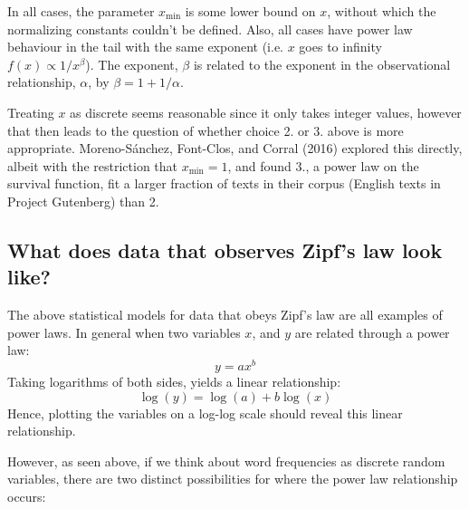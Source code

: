 \documentclass[]{article}
\begin{document}
In all cases, the parameter \(x_\text{min}\) is some lower bound on
\(x\), without which the normalizing constants couldn't be defined.
Also, all cases have power law behaviour in the tail with the same
exponent (i.e. \(x\) goes to infinity \(f(x) \propto 1/x^\beta\)). The
exponent, \(\beta\) is related to the exponent in the observational
relationship, \(\alpha\), by \(\beta = 1 + 1/\alpha\).

Treating \(x\) as discrete seems reasonable since it only takes integer
values, however that then leads to the question of whether choice 2. or
3. above is more appropriate. Moreno-Sánchez, Font-Clos, and Corral
(2016) explored this directly, albeit with the restriction that
\(x_\text{min} = 1\), and found 3., a power law on the survival
function, fit a larger fraction of texts in their corpus (English texts
in Project Gutenberg) than 2.

\hypertarget{what-does-data-that-observes-zipfs-law-look-like}{%
\subsection{What does data that observes Zipf's law look
like?}\label{what-does-data-that-observes-zipfs-law-look-like}}

The above statistical models for data that obeys Zipf's law are all
examples of power laws. In general when two variables \(x\), and \(y\)
are related through a power law: \[
y = ax^b
\] Taking logarithms of both sides, yields a linear relationship: \[
\log(y) = \log(a) + b\log(x)
\] Hence, plotting the variables on a log-log scale should reveal this
linear relationship.

However, as seen above, if we think about word frequencies as discrete
random variables, there are two distinct possibilities for where the
power law relationship occurs:
\end{document}
